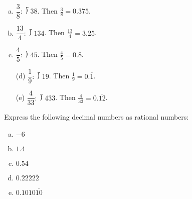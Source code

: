 \documentclass[11pt,letterpaper]{article}
\begin{document}
\sol \par
\begin{minipage}{0.48\textwidth}
\begin{enumerate}[(a)]
\item $\dfrac{3}{8}: \longdivision{3}{8}$. Then $\frac{3}{8}= 0.375$.
\item $\dfrac{13}{4}: \longdivision{13}{4}$. Then $\frac{13}{4}= 3.25$.
\item $\dfrac{4}{5}: \longdivision{4}{5}$. Then $\frac{4}{5}= 0.8$.
\end{enumerate}
\end{minipage}%
\begin{minipage}{0.48\textwidth}
\begin{enumerate}
\item[(d)] $\dfrac{1}{9}: \longdivision{1}{9}$. Then $\frac{1}{9}= 0.\overline{1}$.
\item[(e)] $\dfrac{4}{33}: \longdivision{4}{33}$. Then $\frac{4}{33}= 0.\overline{12}$.
\end{enumerate}
\end{minipage}



\newpage



 Express the following decimal numbers as rational numbers:
\begin{enumerate}[(a)]
\item $-6$
\item $1.4$
\item $0.54$
\item $0.2222\overline{2}$
\item $0.1010\overline{10}$
\end{enumerate} \pspace
\end{document}
